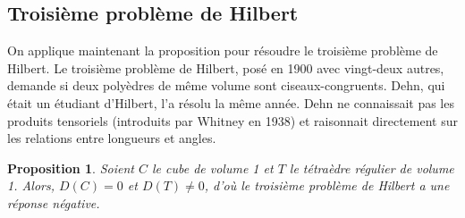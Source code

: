 \documentclass{article}
\theoremstyle{plain}
\newtheorem{proposition}[theorem]{Proposition}
\theoremstyle{definition}
\theoremstyle{remark}
\begin{document}
\subsection{Troisième problème de Hilbert}

On applique maintenant la proposition pour résoudre le troisième problème de Hilbert. Le troisième problème de Hilbert, posé en 1900 avec vingt-deux autres, demande si deux polyèdres de même volume sont ciseaux-congruents. Dehn, qui était un étudiant d'Hilbert, l'a résolu la même année. Dehn ne connaissait pas les produits tensoriels (introduits par Whitney en 1938) et raisonnait directement sur les relations entre longueurs et angles.

\begin{proposition} \label{propcube}
    Soient $C$ le cube de volume 1 et $T$ le tétraèdre régulier de volume 1. Alors, $D(C) = 0$ et $D(T) \ne 0$, d'où le troisième problème de Hilbert a une réponse négative.
\end{proposition}
\end{document}
